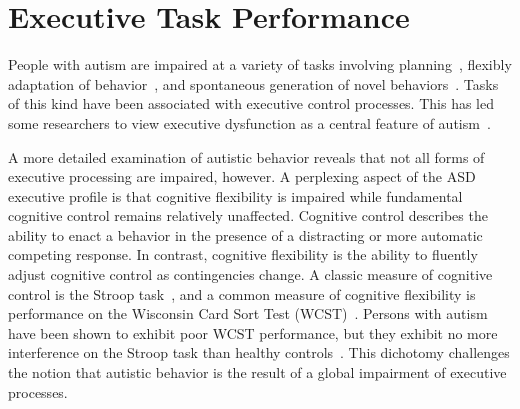 %
%

\section{Executive Task Performance}

People with autism are impaired at a variety of tasks involving planning~\cite{BennettoL:1996:AutismPlanningWCST}, flexibly adaptation of behavior~\cite{BennettoL:1996:AutismPlanningWCST,Ozonoff:1999:AutismStroopWCST}, and spontaneous generation of novel behaviors~\cite{TurnerW:1999:AutismGenerativity}. Tasks of this kind have been associated with executive control processes. This has led some researchers to view executive dysfunction as a central feature of autism~\cite{HughesC:1994:AutismExecutiveDysfunction}.


A more detailed examination of autistic behavior reveals that not all forms of executive processing are impaired, however. A perplexing aspect of the ASD executive profile is that cognitive flexibility is impaired while fundamental cognitive control remains relatively unaffected. Cognitive control describes the ability to enact a behavior in the presence of a distracting or more automatic competing response. In contrast, cognitive flexibility is the ability to fluently adjust cognitive control as contingencies change. A classic measure of cognitive control is the Stroop task~\cite{StroopJR:1935:Interference}, and a common measure of cognitive flexibility is performance on the Wisconsin Card Sort Test (WCST)~\cite{BergEA:1948:WCST}. Persons with autism have been shown to exhibit poor WCST performance, but they exhibit no more interference on the Stroop task than healthy controls~\cite{Ozonoff:1999:AutismStroopWCST}. This dichotomy challenges the notion that autistic behavior is the result of a global impairment of executive processes.

